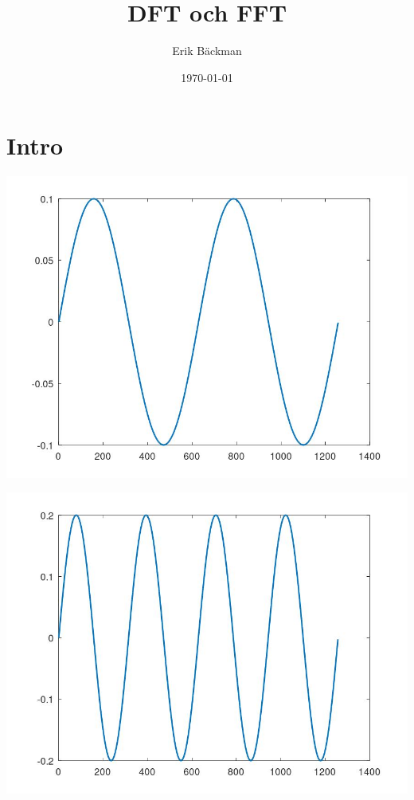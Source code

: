 \documentclass[presentation]{beamer}
\author{Erik Bäckman}
\date{\today}
\title{DFT och FFT}
\begin{document}
\maketitle
\section{Intro}
\label{sec:org9548b81}

\begin{center}
\includegraphics[scale=0.1]{./p1.jpg}
\end{center}  \begin{center}
\includegraphics[scale=0.1]{./p2.jpg}
\end{center}
\end{document}
